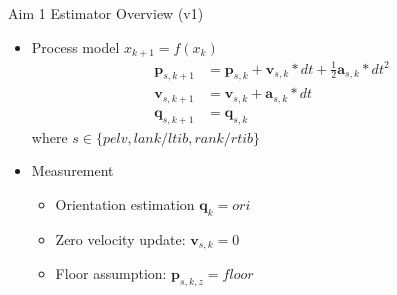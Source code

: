 \documentclass[aspectratio=169]{beamer}
\renewcommand{\vec}{\mathbf}
\begin{document}
        \begin{frame}{Aim 1 Estimator Overview (v1)}
            \begin{itemize}
    			\item Process model $x_{k+1} = f(x_{k})$
    			    \begin{align*}
    			        \vec{p}_{s, k+1} &= \vec{p}_{s, k} + \vec{v}_{s, k}*dt + \frac{1}{2} \vec{a}_{s, k}*dt^2 \\
    			        \vec{v}_{s, k+1} &= \vec{v}_{s, k} + \vec{a}_{s, k}*dt \\
    			        \vec{q}_{s, k+1} &= \vec{q}_{s, k}
    			    \end{align*}
    			    where $s \in \{pelv, lank/ltib, rank/rtib \}$
    			    
			    \item Measurement
			        \begin{itemize}
			            \item Orientation estimation $\vec{q}_{k} = ori$
			            \item Zero velocity update: $\vec{v}_{s, k} = 0$
			            \item Floor assumption: $\vec{p}_{s, k, z} = floor$
			        \end{itemize}
    		\end{itemize}
		\end{frame}
	
	
\end{document}
